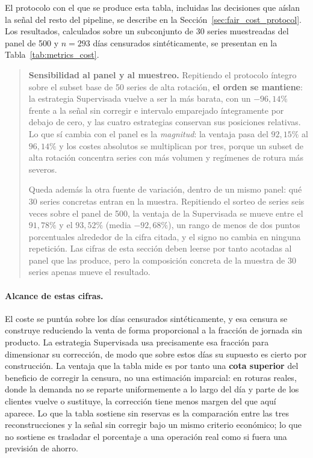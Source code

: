 El protocolo con el que se produce esta tabla, incluidas las decisiones que aíslan la señal del resto del pipeline, se describe en la Sección~\ref{sec:fair_cost_protocol}. Los resultados, calculados sobre un subconjunto de 30 series muestreadas del panel de 500 y $n = 293$ días censurados sintéticamente, se presentan en la Tabla~\ref{tab:metrics_cost}.



\begin{quote}
\small
\textbf{Sensibilidad al panel y al muestreo.} Repitiendo el protocolo íntegro sobre el subset
base de 50 series de alta rotación, \textbf{el orden se mantiene}: la estrategia Supervisada
vuelve a ser la más barata, con un $-96{,}14\%$ frente a la señal sin corregir e intervalo
emparejado íntegramente por debajo de cero, y las cuatro estrategias conservan sus posiciones
relativas. Lo que sí cambia con el panel es la \emph{magnitud}: la ventaja pasa del $92{,}15\%$
al $96{,}14\%$ y los costes absolutos se multiplican por tres, porque un subset de alta
rotación concentra series con más volumen y regímenes de rotura más severos.

Queda además la otra fuente de variación, dentro de un mismo panel: qué 30 series concretas
entran en la muestra. Repitiendo el sorteo de series seis veces sobre el panel de 500, la
ventaja de la Supervisada se mueve entre el $91{,}78\%$ y el $93{,}52\%$ (media $-92{,}68\%$),
un rango de menos de dos puntos porcentuales alrededor de la cifra citada, y el signo no cambia
en ninguna repetición. Las cifras de esta sección deben leerse por tanto acotadas al panel que
las produce, pero la composición concreta de la muestra de 30 series apenas mueve el resultado.
\end{quote}

\paragraph{Alcance de estas cifras.} El coste se puntúa sobre los días censurados sintéticamente, y esa censura se construye reduciendo la venta de forma proporcional a la fracción de jornada sin producto. La estrategia Supervisada usa precisamente esa fracción para dimensionar su corrección, de modo que sobre estos días su supuesto es cierto por construcción. La ventaja que la tabla mide es por tanto una \textbf{cota superior} del beneficio de corregir la censura, no una estimación imparcial: en roturas reales, donde la demanda no se reparte uniformemente a lo largo del día y parte de los clientes vuelve o sustituye, la corrección tiene menos margen del que aquí aparece. Lo que la tabla sostiene sin reservas es la comparación entre las tres reconstrucciones y la señal sin corregir bajo un mismo criterio económico; lo que no sostiene es trasladar el porcentaje a una operación real como si fuera una previsión de ahorro.

